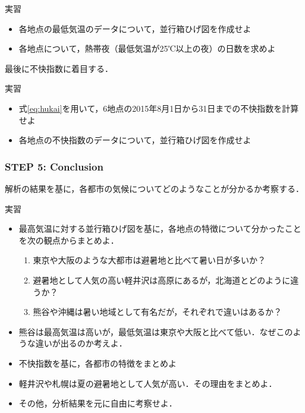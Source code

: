 \begin{itembox}[l]{実習}
%
%
\begin{itemize}
\item
各地点の最低気温のデータについて，並行箱ひげ図を作成せよ
\item
各地点について，熱帯夜（最低気温が25℃以上の夜）の日数を求めよ

\end{itemize}
%
\end{itembox}
%

%
\vspace{0.5cm}
最後に不快指数に着目する．
%
\begin{itembox}[l]{実習}
%
\begin{itemize}
\item
式\eqref{eq:hukai}を用いて，6地点の2015年8月1日から31日までの不快指数を計算せよ
\item
各地点の不快指数のデータについて，並行箱ひげ図を作成せよ
\end{itemize}
%
\end{itembox}
%

\subsubsection*{STEP 5: Conclusion}
%
解析の結果を基に，各都市の気候についてどのようなことが分かるか考察する．
%

\begin{itembox}[l]{実習}
%
\begin{itemize}
\item
最高気温に対する並行箱ひげ図を基に，各地点の特徴について分かったことを次の観点からまとめよ．
	\begin{enumerate}
	\item
	東京や大阪のような大都市は避暑地と比べて暑い日が多いか？
	\item
	避暑地として人気の高い軽井沢は高原にあるが，北海道とどのように違うか？
	\item
	熊谷や沖縄は暑い地域として有名だが，それぞれで違いはあるか？	 
	\end{enumerate}
\item
熊谷は最高気温は高いが，最低気温は東京や大阪と比べて低い．なぜこのような違いが出るのか考えよ．
\item
不快指数を基に，各都市の特徴をまとめよ
\item
軽井沢や札幌は夏の避暑地として人気が高い．その理由をまとめよ．
\item
その他，分析結果を元に自由に考察せよ．
\end{itemize}
%
\end{itembox}



